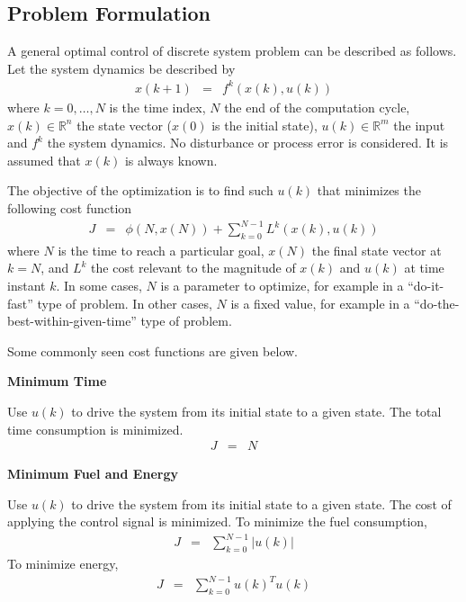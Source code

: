 \subsection{Problem Formulation}

A general optimal control of discrete system problem can be described as follows. Let the system dynamics be described by
\begin{eqnarray}
  x(k+1) &=& f^k\left(x(k), u(k)\right) \label{eq:optimalrobustcs:generaldynamic}
\end{eqnarray}
where $k=0,\ldots, N$ is the time index, $N$ the end of the computation cycle, $x(k)\in\mathbb{R}^n$ the state vector ($x(0)$ is the initial state), $u(k)\in\mathbb{R}^m$ the input and $f^k$ the system dynamics. No disturbance or process error is considered. It is assumed that $x(k)$ is always known.

The objective of the optimization is to find such $u(k)$ that minimizes the following cost function
\begin{eqnarray}
  J &=& \phi\left(N, x(N)\right) + \sum_{k=0}^{N-1}L^k\left(x(k), u(k)\right) \label{eq:optimalrobustcs:generaldiscrete}
\end{eqnarray}
where $N$ is the time to reach a particular goal, $x(N)$ the final state vector at $k=N$, and $L^k$ the cost relevant to the magnitude of $x(k)$ and $u(k)$ at time instant $k$. In some cases, $N$ is a parameter to optimize, for example in a ``do-it-fast'' type of problem. In other cases, $N$ is a fixed value, for example in a ``do-the-best-within-given-time'' type of problem.

Some commonly seen cost functions are given below.

\vspace{0.1in}
\noindent \textbf{Minimum Time}
\vspace{0.1in}

Use $u(k)$ to drive the system from its initial state to a given state. The total time consumption is minimized.
\begin{eqnarray}
  J &=& N \nonumber
\end{eqnarray}

\vspace{0.1in}
\noindent \textbf{Minimum Fuel and Energy}
\vspace{0.1in}

Use $u(k)$ to drive the system from its initial state to a given state. The cost of applying the control signal is minimized. To minimize the fuel consumption,
\begin{eqnarray}
  J &=& \sum_{k=0}^{N-1} |u(k)| \nonumber
\end{eqnarray}
To minimize energy,
\begin{eqnarray}
  J &=& \sum_{k=0}^{N-1} u(k)^Tu(k) \nonumber
\end{eqnarray}

